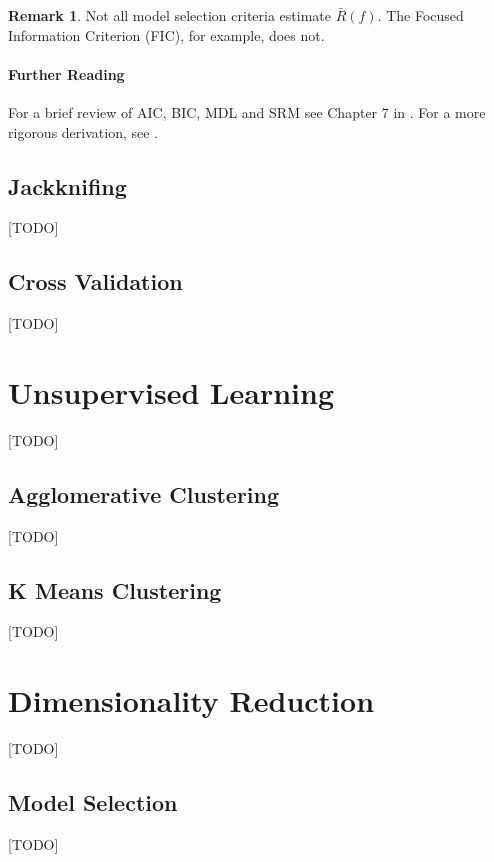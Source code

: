\documentclass[12pt,a4paper]{article}
\theoremstyle{plain}
\theoremstyle{definition}
\newtheorem{remark}{Remark}
\newcommand{\risk}{R}
\newcommand{\hyp}{f}
\newcommand{\insample}{\bar{\risk}(\hyp)}
\begin{document}
\begin{remark}
Not all model selection criteria estimate $\insample$. The Focused Information Criterion (FIC), for example, does not.
\end{remark}




\paragraph{Further Reading}
For a brief review of AIC, BIC, MDL and SRM see Chapter 7 in \citep{hastie_elements_2003}. 
For a more rigorous derivation, see \cite{claeskens_model_2008}.





\subsection{Jackknifing}
\label{sec:jackknife}
[TODO]




\subsection{Cross Validation}
\label{sec:cv}
[TODO]


\section{Unsupervised Learning}
\label{sec:unsupervised}
[TODO]


\subsection{Agglomerative Clustering}
[TODO]

\subsection{K Means Clustering}
[TODO]



\section{Dimensionality Reduction}
\label{sec:dim_reduce}
[TODO]

\subsection{Model Selection}
[TODO]
\end{document}
